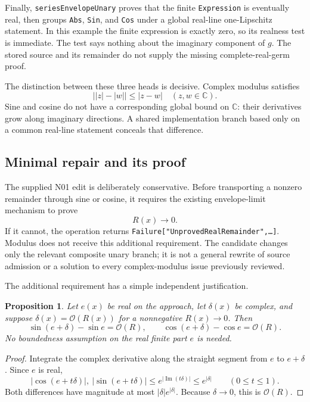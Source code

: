 \documentclass[11pt,a4paper]{article}
\newtheorem{proposition}[theorem]{Proposition}
\newcommand{\OO}{\mathcal O}
\begin{document}
Finally, \texttt{seriesEnvelopeUnary} proves that the finite \texttt{Expression} is eventually real, then groups \texttt{Abs}, \texttt{Sin}, and \texttt{Cos} under a global real-line one-Lipschitz statement. In this example the finite expression is exactly zero, so its realness test is immediate. The test says nothing about the imaginary component of $g$. The stored source and its remainder do not supply the missing complete-real-germ proof.\cite{envelope}

The distinction between these three heads is decisive. Complex modulus satisfies
\[
 \bigl||z|-|w|\bigr|\le|z-w| \quad(z,w\in\mathbb C).
\]
Sine and cosine do not have a corresponding global bound on $\mathbb C$: their derivatives grow along imaginary directions. A shared implementation branch based only on a common real-line statement conceals that difference.

\subsection{Minimal repair and its proof}
The supplied N01 edit is deliberately conservative. Before transporting a nonzero remainder through sine or cosine, it requires the existing envelope-limit mechanism to prove
\[
 R(x)\longrightarrow0.
\]
If it cannot, the operation returns \texttt{Failure["UnprovedRealRemainder",\ldots]}. Modulus does not receive this additional requirement. The candidate changes only the relevant composite unary branch; it is not a general rewrite of source admission or a solution to every complex-modulus issue previously reviewed.

The additional requirement has a simple independent justification.
\begin{proposition}
Let $e(x)$ be real on the approach, let $\delta(x)$ be complex, and suppose $\delta(x)=\OO(R(x))$ for a nonnegative $R(x)\to0$. Then
\[
 \sin(e+\delta)-\sin e=\OO(R),\qquad
 \cos(e+\delta)-\cos e=\OO(R).
\]
No boundedness assumption on the real finite part $e$ is needed.
\end{proposition}
\begin{proof}
Integrate the complex derivative along the straight segment from $e$ to $e+\delta$. Since $e$ is real,
\[
 |\cos(e+t\delta)|,\ |\sin(e+t\delta)|
 \le e^{|\operatorname{Im}(t\delta)|}
 \le e^{|\delta|}\qquad(0\le t\le1).
\]
Both differences have magnitude at most $|\delta|e^{|\delta|}$. Because $\delta\to0$, this is $\OO(R)$.
\end{proof}
\end{document}

